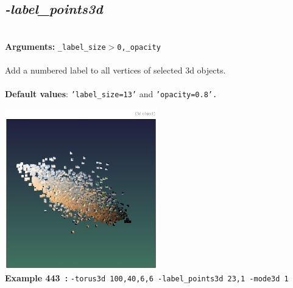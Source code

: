 \documentclass[a4paper,11pt,twoside]{book}
\begin{document}
\subsection{\emph{-label\_points3d} }\vspace*{-0.5em}
~\\\textbf{Arguments: } 
{\small \texttt{\_label\_size$>$0,\_opacity}}\\~\\
Add a numbered label to all vertices of selected 3d objects.
~\\~\\\textbf{Default values}: {\small \texttt{'label\_size=13'} and \texttt{'opacity=0.8'.}}
\begin{center}\includegraphics[keepaspectratio=true,height=7cm,width=\textwidth]{img/gmic_def443.jpg}\\
{\footnotesize \textbf{Example 443~:} \texttt{-torus3d 100,40,6,6 -label\_points3d 23,1 -mode3d 1}}
\end{center}
\end{document}

